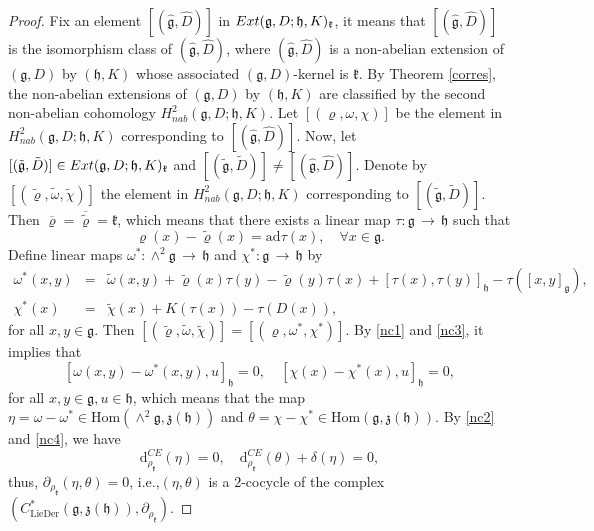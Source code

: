 \documentclass[10pt,a4paper]{amsart}
\newcommand{\Hom}{\mathrm{Hom}}
\newcommand{\ad}{\mathrm{ad}}
\newcommand{\dM}{\mathrm{d}}
\newcommand{\frkk}{\mathfrak k}
\newcommand{\frkz}{\mathfrak z}
\newcommand{\g}{\mathfrak g}
\newcommand{\h}{\mathfrak h}
\newcommand{\lon }{\,\rightarrow\,}
\begin{document}
    \begin{proof}
Fix an element $[(\hat{\g}, \hat{D})]$ in $\rm{Ext}(\g, D;\h,K)_\frkk$, it means that $[(\hat{\g}, \hat{D})]$ is the isomorphism class of $(\hat{\g}, \hat{D})$, where $(\hat{\g}, \hat{D})$ is a non-abelian extension of $(\g,D)$ by $(\h,K)$
whose associated $(\g, D)$-kernel is $\frkk$. 
By Theorem \ref{corres}, the non-abelian extensions of $(\g, D)$ by $(\h, K)$ are classified by the second non-abelian cohomology $H^2_{nab}(\g,D; \h,K)$. Let $[(\varrho, \omega, \chi)]$ be the element in $H^{2}_{nab}(\g, D;\h,K)$ corresponding to $[(\hat{\g}, \hat{D})]$. Now, let $[(\tilde{\g}, \tilde{D})]\in{\rm Ext}(\g, D;\h,K)_\frkk$ and $[(\tilde{\g}, \tilde{D})]\neq [(\hat{\g}, \hat{D})]$. Denote by $[(\tilde{\varrho}, \tilde{\omega}, \tilde{\chi})]$ the element in $H^{2}_{nab}(\g,D; \h,K)$ corresponding to $[(\tilde{\g}, \tilde{D})]$. Then $\overline{\varrho}=\overline{\tilde{\varrho}}=\frkk$, which means that there exists a linear map $\tau:\g\lon\h$ such that
$$\varrho(x)-\tilde{\varrho}(x)=\ad\tau(x), \quad \forall x\in\g.$$
Define linear maps $\omega^*:\wedge^2\g\lon\h$ and $\chi^*:\g\lon\h$ by
\begin{eqnarray}
\label{H1}\omega^*(x, y)&=&\tilde{\omega}(x, y)+\tilde{\varrho}(x)\tau(y)-\tilde{\varrho}(y)\tau(x)+[\tau(x), \tau(y)]_\h-\tau([x, y]_\g),\\
\label{H2}\chi^*(x)&=&\tilde{\chi}(x)+K(\tau(x))-\tau(D(x)),
\end{eqnarray}
for all $x, y\in\g$. Then $[(\tilde{\varrho}, \tilde{\omega}, \tilde{\chi})]=[(\varrho, \omega^*, \chi^*)]$. By \eqref{nc1} and \eqref{nc3}, it implies that
$$
[\omega(x, y)-\omega^*(x, y), u]_\h=0,\quad [\chi(x)-\chi^*(x), u]_\h=0,
$$
for all $x, y\in\g, u\in\h$,
which means that the map $\eta=\omega-\omega^*\in\Hom(\wedge^2\g, \frkz(\h))$ and $\theta=\chi-\chi^*\in\Hom(\g, \frkz(\h))$. By \eqref{nc2} and \eqref{nc4}, we have
$$
\dM^{CE}_{\rho_\frkk}(\eta)=0, \quad \dM^{CE}_{\rho_\frkk}(\theta)+\delta(\eta)=0,
$$
thus, $\partial_{\rho_\frkk}(\eta, \theta)=0$, i.e.,$(\eta, \theta)$ is a $2$-cocycle of the complex $(C^{*}_{\mathrm{LieDer}}(\g, \frkz(\h)), \partial_{\rho_\frkk})$. 


\end{proof}
\end{document}
